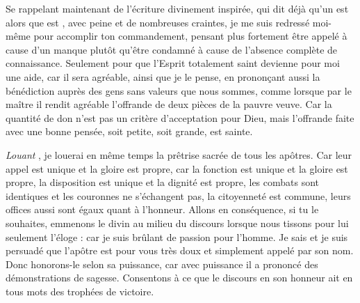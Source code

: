 Se rappelant maintenant de l'écriture divinement inspirée, qui dit déjà qu'un  est 
alors que  est ,  
avec peine et de nombreuses craintes, je me suis redressé moi-même pour accomplir  ton commandement, 
pensant plus fortement être appelé à cause d'un manque  plutôt qu'être condamné à cause de l'absence complète de connaissance. 
Seulement  %
pour que l'Esprit totalement saint devienne pour moi une aide, 
car il  sera agréable, ainsi que je le pense, 
en prononçant aussi la bénédiction auprès des gens sans valeurs que nous sommes,
comme lorsque par le maître il rendit agréable  l'offrande  de deux pièces de la pauvre veuve.
Car la quantité de don n'est pas un critère d'acceptation pour Dieu, %
mais  l'offrande faite avec une bonne pensée, soit petite,  soit grande, est sainte.

\emph{Louant} , je louerai en même temps la prêtrise sacrée %
de tous les apôtres.
Car leur appel est unique et la gloire est propre, %
car la fonction est unique et la gloire est propre,
la disposition est unique et la dignité est propre,
les combats sont identiques et les couronnes ne s'échangent pas,
la citoyenneté est commune, 
leurs offices aussi sont égaux quant à l'honneur.
Allons en conséquence, si tu le souhaites, 
emmenons le divin  au milieu du discours
lorsque  nous tissons pour lui seulement l'éloge :  car je suis brûlant de passion pour l'homme.
Je sais et je suis persuadé que  l'apôtre est pour vous très doux et simplement appelé par son nom.
Donc honorons-le  selon sa puissance, car avec puissance il a prononcé des démonstrations de sagesse.
Consentons à ce que le discours en son honneur ait en tous mots des trophées de victoire.

